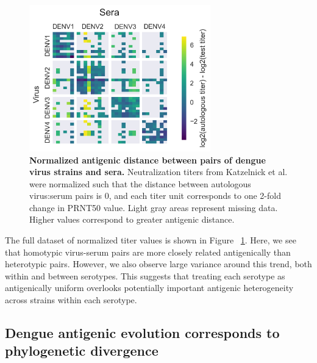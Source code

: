 \documentclass[11pt,oneside,letterpaper]{article}
\begin{document}
\begin{figure}[h]
\begin{centering}
\includegraphics[width=0.7\textwidth]{../figures/png/titer_heatmap.png}
    \caption{\textbf{Normalized antigenic distance between pairs of dengue virus strains and sera.} Neutralization titers from Katzelnick et al. were normalized such that the distance between autologous virus:serum pairs is 0, and each titer unit corresponds to one 2-fold change in PRNT50 value. Light gray areas represent missing data. Higher values correspond to greater antigenic distance.}
     \label{titer_heatmap}
\end{centering}
\end{figure}

The full dataset of normalized titer values is shown in Figure ~\ref{titer_heatmap}.
Here, we see that homotypic virus-serum pairs are more closely related antigenically than heterotypic pairs.
However, we also observe large variance around this trend, both within and between serotypes.
This suggests that treating each serotype as antigenically uniform overlooks potentially important antigenic heterogeneity across strains within each serotype.

\subsection{Dengue antigenic evolution corresponds to phylogenetic divergence}
\end{document}
